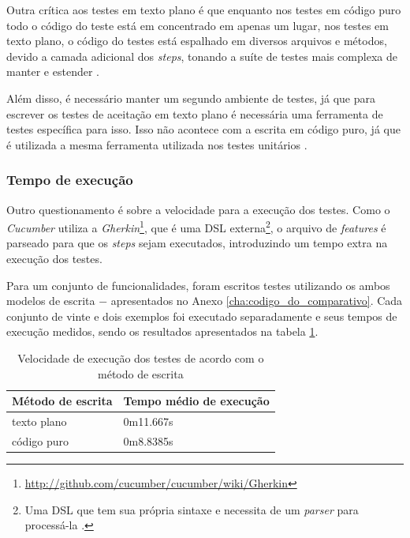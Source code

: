 Outra crítica aos testes em texto plano é que enquanto nos testes em código puro todo o código do teste está em concentrado em apenas um lugar, nos testes em texto plano, o código do testes está espalhado em diversos arquivos e métodos, devido a camada adicional dos \textit{steps}, tonando a suíte de testes mais complexa de manter e estender \cite{SteakOverCucumber}.

Além disso, é necessário manter um segundo ambiente de testes, já que para escrever os testes de aceitação em texto plano é necessária uma ferramenta de testes específica para isso. Isso não acontece com a escrita em código puro, já que é utilizada a mesma ferramenta utilizada nos testes unitários \cite{WhyBotherWithCucumberTesting}.


\subsubsection{Tempo de execução} %
\label{subsub:tempo_de_execucao}

Outro questionamento é sobre a velocidade para a execução dos testes. Como o \textit{Cucumber} utiliza a \textit{Gherkin}\footnote{\url{http://github.com/cucumber/cucumber/wiki/Gherkin}}, que é uma DSL externa\footnote{Uma DSL que tem sua própria sintaxe e necessita de um \textit{parser} para processá-la \cite{DSLFowler}.}, o arquivo de \textit{features} é parseado para que os \textit{steps} sejam executados, introduzindo um tempo extra na execução dos testes.

Para um conjunto de funcionalidades, foram escritos testes utilizando os ambos modelos de escrita $-$ apresentados no Anexo \ref{cha:codigo_do_comparativo}. Cada conjunto de vinte e dois exemplos foi executado separadamente e seus tempos de execução medidos, sendo os resultados apresentados na tabela \ref{table:tempo_de_execucao}.

\begin{table}[ht]
\caption{Velocidade de execução dos testes de acordo com o método de escrita}
\label{table:tempo_de_execucao}
\centering
\begin{tabular}{p{4.5cm} p{6.5cm}}
\toprule
\textbf{Método de escrita} & \textbf{Tempo médio de execução} \\
\midrule[1pt]
texto plano & 0m11.667s \\ \midrule
código puro & 0m8.8385s \\
\bottomrule
\end{tabular}
\end{table}

